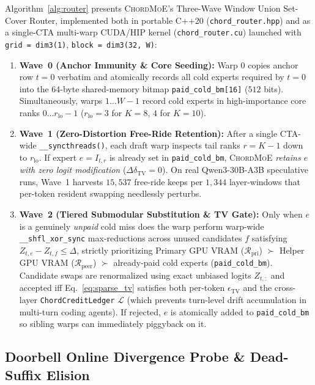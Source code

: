 \documentclass[10pt,twocolumn]{article}
\theoremstyle{definition}
\begin{document}
Algorithm~\ref{alg:router} presents \textsc{ChordMoE}'s Three-Wave Window Union Set-Cover Router, implemented both in portable C++20 (\texttt{chord\_router.hpp}) and as a single-CTA multi-warp CUDA/HIP kernel (\texttt{chord\_router.cu}) launched with \texttt{grid = dim3(1)}, \texttt{block = dim3(32, W)}:
\begin{enumerate}
  \item \textbf{Wave~0 (Anchor Immunity \& Core Seeding):} Warp $0$ copies anchor row $t=0$ verbatim and atomically records all cold experts required by $t=0$ into the 64-byte shared-memory bitmap \texttt{paid\_cold\_bm[16]} ($512$ bits). Simultaneously, warps $1 \dots W-1$ record cold experts in high-importance core ranks $0 \dots r_{\text{lo}}-1$ ($r_{\text{lo}} = 3$ for $K=8$, $4$ for $K=10$).
  \item \textbf{Wave~1 (Zero-Distortion Free-Ride Retention):} After a single CTA-wide \texttt{\_\_syncthreads()}, each draft warp inspects tail ranks $r = K-1$ down to $r_{\text{lo}}$. If expert $e = I_{t,r}$ is already set in \texttt{paid\_cold\_bm}, \textsc{ChordMoE} \emph{retains $e$ with zero logit modification} ($\Delta \delta_{\mathrm{TV}} = 0$). On real Qwen3-30B-A3B speculative runs, Wave~1 harvests $15,537$ free-ride keeps per $1,344$ layer-windows that per-token resident swapping needlessly perturbs.
  \item \textbf{Wave~2 (Tiered Submodular Substitution \& TV Gate):} Only when $e$ is a genuinely \emph{unpaid} cold miss does the warp perform warp-wide \texttt{\_\_shfl\_xor\_sync} max-reductions across unused candidates $f$ satisfying $Z_{t,e} - Z_{t,f} \le \Delta$, strictly prioritizing Primary GPU VRAM ($\mathcal{R}_{\text{pri}}$) $\succ$ Helper GPU VRAM ($\mathcal{R}_{\text{peer}}$) $\succ$ already-paid cold experts (\texttt{paid\_cold\_bm}). Candidate swaps are renormalized using exact unbiased logits $Z_{t,:}$ and accepted iff Eq.~\eqref{eq:sparse_tv} satisfies both per-token $\epsilon_{\mathrm{TV}}$ and the cross-layer \texttt{ChordCreditLedger} $\mathcal{L}$ (which prevents turn-level drift accumulation in multi-turn coding agents). If rejected, $e$ is atomically added to \texttt{paid\_cold\_bm} so sibling warps can immediately piggyback on it.
\end{enumerate}

\subsection{Doorbell Online Divergence Probe \& Dead-Suffix Elision}
\label{sec:abort}
\end{document}
